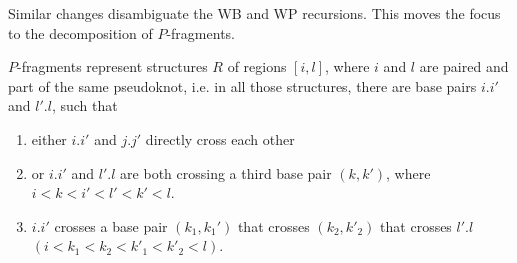 \documentclass[11pt]{article} %
\begin{document}
Similar changes disambiguate the WB and WP recursions. 
This moves the focus to the decomposition of $P$-fragments. 

$P$-fragments represent structures $R$ of regions $[i,l]$, where
$i$ and $l$ are paired and part of the same pseudoknot, i.e. in all those structures, there are base pairs $i.i'$ and $l'.l$, such that
\begin{enumerate}
\item either $i.i'$ and $j.j'$ directly cross each other 
\item or $i.i'$ and $l'.l$ are both crossing a third base pair $(k,k')$, where $i<k<i'<l'<k'<l$.
\item $i.i'$ crosses a base pair $(k_1,k_1')$ that crosses $(k_2,k'_2)$ that crosses $l'.l$ $(i<k_1<k_2<k'_1<k'_2<l)$.
\end{enumerate}
\end{document}
